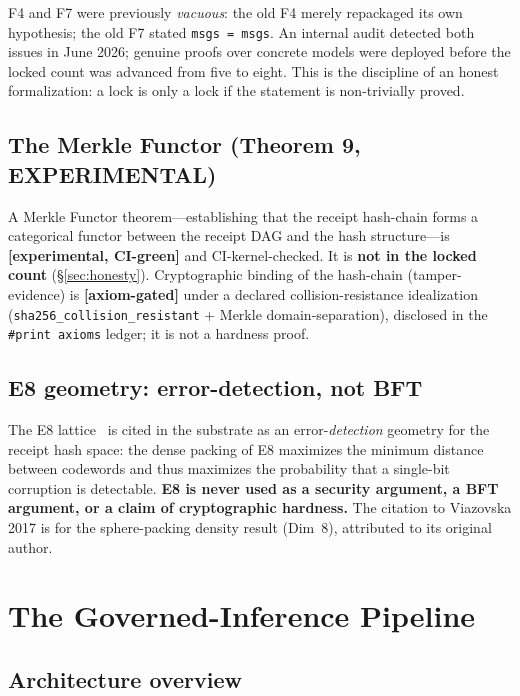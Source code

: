 \documentclass[11pt,letterpaper]{article}
\theoremstyle{definition}
\newcommand{\experimental}{\textbf{[experimental, CI-green]}}
\newcommand{\axiomgated}{\textbf{[axiom-gated]}}
\begin{document}
F4 and F7 were previously \emph{vacuous}: the old F4 merely repackaged its own
hypothesis; the old F7 stated \texttt{msgs = msgs}.  An internal audit detected
both issues in June 2026; genuine proofs over concrete models were deployed
before the locked count was advanced from five to eight.  This is the discipline
of an honest formalization: a lock is only a lock if the statement is
non-trivially proved.

\subsection{The Merkle Functor (Theorem 9, EXPERIMENTAL)}

A Merkle Functor theorem---establishing that the receipt hash-chain forms a
categorical functor between the receipt DAG and the hash structure---is
\experimental{} and CI-kernel-checked.  It is \textbf{not in the locked
count} (\S\ref{sec:honesty}).  Cryptographic binding of the hash-chain
(tamper-evidence) is \axiomgated{} under a declared collision-resistance
idealization (\texttt{sha256\_collision\_resistant} + Merkle domain-separation),
disclosed in the \texttt{\#print axioms} ledger; it is not a hardness proof.

\subsection{E8 geometry: error-detection, not BFT}

The E8 lattice~\cite{viazovska2016,conway_sloane} is cited in the substrate as
an error-\emph{detection} geometry for the receipt hash space: the dense packing
of E8 maximizes the minimum distance between codewords and thus maximizes the
probability that a single-bit corruption is detectable.  \textbf{E8 is never used
as a security argument, a BFT argument, or a claim of cryptographic hardness.}
The citation to Viazovska 2017 is for the sphere-packing density result
(Dim~8), attributed to its original author.

\section{The Governed-Inference Pipeline}
\label{sec:pipeline}

\subsection{Architecture overview}
\end{document}
